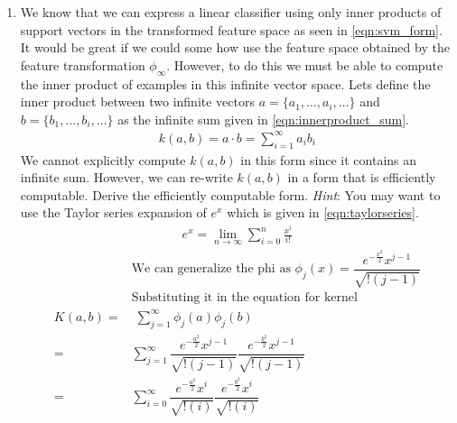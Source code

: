 \begin{enumerate}
\begin{enumerate}
  \item {} We know that we can express a linear classifier
    using only inner products of support vectors in the transformed
    feature space as seen in \autoref{eqn:svm_form}.  It would be
    great if we could some how use the feature space obtained by the
    feature transformation $\phi_{\infty}$.  However, to do this we
    must be able to compute the inner product of examples in this
    infinite vector space.  Lets define the inner product between two
    infinite vectors $a=\{a_1,\ldots,a_i,\ldots\}$ and
    $b=\{b_1,\ldots,b_i,\ldots\}$ as the infinite sum given in
    \autoref{eqn:innerproduct_sum}.
    \begin{eqnarray}
      k(a,b) = a \cdot b = \sum_{i=1}^{\infty} a_i b_i
      \label{eqn:innerproduct_sum}
    \end{eqnarray}
    We cannot explicitly compute $k(a,b)$ in this form since it
    contains an infinite sum.  However, we can re-write $k(a,b)$ in a
    form that is efficiently computable.  Derive the efficiently
    computable form.  \emph{Hint}: You may want to use the Taylor
    series expansion of $e^x$ which is given in
    \autoref{eqn:taylorseries}.
    \begin{eqnarray}
      e^{x}=\lim_{n \rightarrow \infty} \sum_{i=0}^n \frac{x^i}{i!}
      \label{eqn:taylorseries}
    \end{eqnarray}
\begin{align*}
	& \text{We can generalize the phi as } \phi_{j}(x) = \dfrac{e^{-\frac{x^2}{2}} x^{j-1}}
                                                                                                          {\sqrt{! (j-1)}} \\
	&\text{Substituting it in the equation for kernel }\\
	K(a,b) = & \; \sum\limits_{j=1}^{\infty} \phi_j(a) \phi_j(b) \\
	=& \sum\limits_{j=1}^{\infty} \dfrac{e^{-\frac{a^2}{2}} x^{j-1}}
                                                                                                          {\sqrt{! (j-1)}} \dfrac{e^{-\frac{b^2}{2}} x^{j-1}}
                                                                                                          {\sqrt{! (j-1)}} \\
	= & \sum\limits_{i=0}^{\infty} \dfrac{e^{-\frac{a^2}{2}} x^{i}}
                                                                                                          {\sqrt{! (i)}} \dfrac{e^{-\frac{b^2}{2}} x^{i}}
                                                                                                          {\sqrt{! (i)}} \\

\end{align*}
\end{enumerate}
\end{enumerate}
